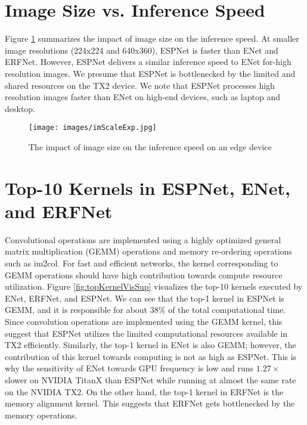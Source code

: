 \documentclass[runningheads]{llncs}
\begin{document}
\section{Image Size vs. Inference Speed}
\label{sec:impactSup}
Figure \ref{fig:impactImSpeedSup} summarizes the impact of image size on the inference speed. At smaller image resolutions (224x224 and 640x360), ESPNet is faster than ENet and ERFNet. However, ESPNet delivers a similar inference speed to ENet for-high resolution images. We presume that ESPNet is bottlenecked by the limited and shared resources on the TX2 device. We note that ESPNet processes high resolution images faster than ENet on high-end devices, such as laptop and desktop.

\begin{figure}[b!]
	\centering
	\texttt{[image: images/imScaleExp.jpg]}
	\caption{The impact of image size on the inference speed on an edge device}
	\label{fig:impactImSpeedSup}
\end{figure}

\section{Top-10 Kernels in ESPNet, ENet, and ERFNet}
\label{sec:topKernSUp}

Convolutional operations are implemented using a highly optimized general matrix multiplication (GEMM) operations and memory re-ordering operations such as im2col. For fast and efficient networks, the kernel corresponding to GEMM operations should have high contribution towards compute resource utilization. Figure \ref{fig:topKernelVisSup} visualizes the top-10 kernels executed by ENet, ERFNet, and ESPNet. We can see that the top-1 kernel in ESPNet is GEMM, and it is responsible for about 38\% of the total computational time. Since convolution operations are implemented using the GEMM kernel, this suggest that ESPNet utilizes the limited computational resources available in TX2 efficiently. Similarly, the top-1 kernel in ENet is also GEMM; however, the contribution of this kernel towards computing is not as high as ESPNet. This is why the sensitivity of ENet towards GPU frequency is low and runs $1.27 \times$ slower on NVIDIA TitanX than ESPNet while running at almost the same rate on the NVIDIA TX2. On the other hand, the top-1 kernel in ERFNet is the memory alignment kernel. This suggests that ERFNet gets bottlenecked by the memory operations.
\end{document}
